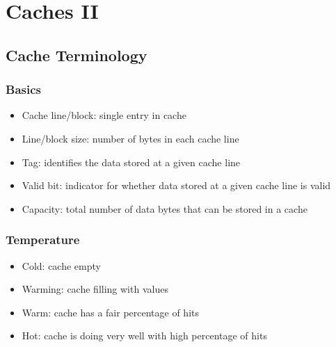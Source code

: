 \chapter{Caches II}

\section{Cache Terminology}
\subsection{Basics}
\begin{itemize}
    \item Cache line/block: single entry in cache
    \item Line/block size: number of bytes in each cache line
    \item Tag: identifies the data stored at a given cache line
    \item Valid bit: indicator for whether data stored at a given cache line is valid
    \item Capacity: total number of data bytes that can be stored in a cache
\end{itemize}

\subsection{Temperature}
\begin{itemize}
    \item Cold: cache empty
    \item Warming: cache filling with values
    \item Warm: cache has a fair percentage of hits
    \item Hot: cache is doing very well with high percentage of hits
\end{itemize}

